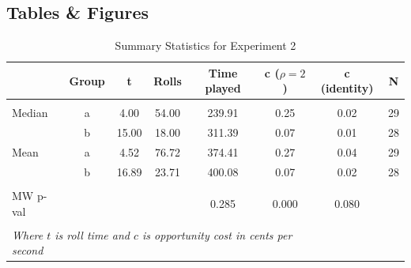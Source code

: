 \documentclass[a4paper,12pt]{article}
\begin{document}
\printbibliography

\newpage

\begin{appendices}

\section{Tables \& Figures}
\label{appendix:graphs}


\begin{table}
  \caption{Summary Statistics for Experiment 2}
  \label{table:descriptive-3}
  \begin{center}
    \begin{tabular}{lccccccc}
      \hline
      & Group & t &  Rolls  &  Time played & c ($\rho = 2$) & c (identity) & N \\
      \hline
      \hline \\ [-1.8ex]
      Median &         a &       4.00 & 54.00 & 239.91 &              0.25 &                      0.02 & 29  \\
      &         b &      15.00 & 18.00 & 311.39 &              0.07 &                      0.01 & 28  \\
      Mean   &         a &       4.52 & 76.72 & 374.41 &              0.27 &                      0.04 & 29  \\
      &         b &      16.89 & 23.71 & 400.08 &              0.07 &                      0.02 & 28 \\
      \hline \\ [-1.8ex]
      MW p-val & & & & 0.285 & 0.000 & 0.080 \\
      \hline \\ [-1.8ex]
      \multicolumn{6}{l}{\textit{Where $t$ is roll time and $c$ is opportunity cost in cents per second}} \\
    \end{tabular}
  \end{center}
\end{table}


\end{appendices}
\end{document}

